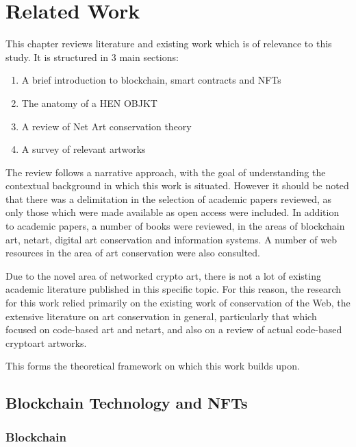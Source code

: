 \chapter{Related Work}
\label{chap:related_work}

This chapter reviews literature and existing work which is of relevance to this study. It is structured in 3 main sections:

\begin{enumerate}
    \item A brief introduction to blockchain, smart contracts and NFTs
    \item The anatomy of a HEN OBJKT
    \item A review of Net Art conservation theory
    \item A survey of relevant artworks
\end{enumerate}

\vspace{0.5cm}

The review follows a narrative approach, with the goal of understanding the contextual background in which this work is situated. However it should be noted that there was a delimitation in the selection of academic papers reviewed, as only those which were made available as open access were included. In addition to academic papers, a number of books were reviewed, in the areas of blockchain art, netart, digital art conservation and information systems. A number of web resources in the area of art conservation were also consulted. 

Due to the novel area of networked crypto art, there is not a lot of existing academic literature published in this specific topic. For this reason, the research for this work relied primarily on the existing work of conservation of the Web, the extensive literature on art conservation in general, particularly that which focused on code-based art and netart, and also on a review of actual code-based cryptoart artworks.

This forms the theoretical framework on which this work builds upon.


\section{Blockchain Technology and NFTs}


\subsection{Blockchain}


